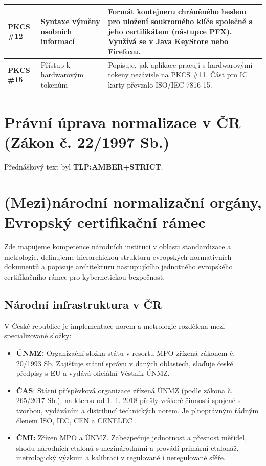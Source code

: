 \documentclass[10pt,a4paper]{article}
\begin{document}
\begin{center}
\begin{tabular}{|l|p{4.5cm}|p{9.0cm}|}
			\textbf{PKCS \#12} & Syntaxe výměny osobních informací & Formát kontejneru chráněného heslem pro uložení soukromého klíče společně s jeho certifikátem (nástupce PFX). Využívá se v Java KeyStore nebo Firefoxu. \\ \hline
			\textbf{PKCS \#15} & Přístup k hardwarovým tokenům & Popisuje, jak aplikace pracují s hardwarovými tokeny nezávisle na PKCS \#11. Část pro IC karty převzalo ISO/IEC 7816-15. \\ \hline
		\end{tabular}
	\end{center}
	
	\section{Právní úprava normalizace v ČR (Zákon č. 22/1997 Sb.)}
	
	Přednáškový text byl \textbf{TLP:AMBER+STRICT}.
	
	
	\section{(Mezi)národní normalizační orgány, Evropský certifikační rámec}
	
	Zde mapujeme kompetence národních institucí v oblasti standardizace a metrologie, definujeme hierarchickou strukturu evropských normativních dokumentů a popisuje architekturu nastupujícího jednotného evropského certifikačního rámce pro kybernetickou bezpečnost.
	
	\subsection{Národní infrastruktura v ČR}
	V České republice je implementace norem a metrologie rozdělena mezi specializované složky:
	\begin{itemize}
		\item \textbf{ÚNMZ:} 
		Organizační složka státu v resortu MPO zřízená zákonem č. 20/1993 Sb. 
		Zajišťuje státní správu v daných oblastech, slaďuje české předpisy s EU a vydává oficiální Věstník ÚNMZ.
		
		\item \textbf{ČAS}: 
		Státní příspěvková organizace zřízená ÚNMZ (podle zákona č. 265/2017 Sb.), na kterou od 1. 1. 2018 přešly veškeré činnosti spojené s tvorbou, vydáváním a distribucí technických norem. Je plnoprávným řádným členem ISO, IEC, CEN a CENELEC .
		
		\item \textbf{ČMI:} 
		Zřízen MPO a ÚNMZ. 
		Zabezpečuje jednotnost a přesnost měřidel, shodu národních etalonů s mezinárodními a provádí primární etalonáž, metrologický výzkum a kalibraci v regulované i neregulované sféře.
	\end{itemize}
		
\end{document}
